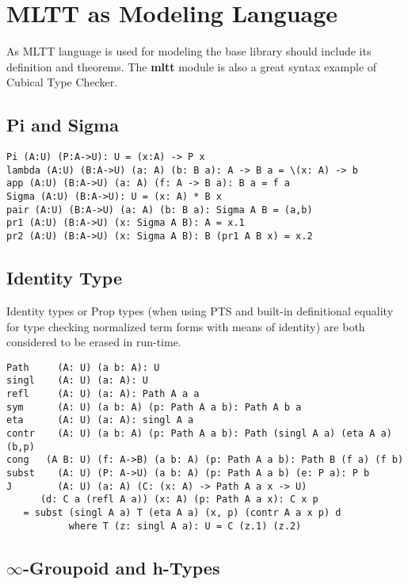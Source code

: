 \documentclass{article}
\begin{document}
\section{MLTT as Modeling Language}

As MLTT language is used for modeling the base library should include its definition and theorems.
The {\bf mltt} module is also a great syntax example of Cubical Type Checker.

\subsection{Pi and Sigma}

\begin{lstlisting}[mathescape=true]
Pi (A:U) (P:A->U): U = (x:A) -> P x
lambda (A:U) (B:A->U) (a: A) (b: B a): A -> B a = \(x: A) -> b
app (A:U) (B:A->U) (a: A) (f: A -> B a): B a = f a
Sigma (A:U) (B:A->U): U = (x: A) * B x
pair (A:U) (B:A->U) (a: A) (b: B a): Sigma A B = (a,b)
pr1 (A:U) (B:A->U) (x: Sigma A B): A = x.1
pr2 (A:U) (B:A->U) (x: Sigma A B): B (pr1 A B x) = x.2
\end{lstlisting}

\subsection{Identity Type}

Identity types or Prop types (when using PTS and built-in definitional equality for type checking
normalized term forms with means of identity) are both considered to be erased in run-time.

\begin{lstlisting}[mathescape=true]
Path     (A: U) (a b: A): U
singl    (A: U) (a: A): U
refl     (A: U) (a: A): Path A a a
sym      (A: U) (a b: A) (p: Path A a b): Path A b a
eta      (A: U) (a: A): singl A a
contr    (A: U) (a b: A) (p: Path A a b): Path (singl A a) (eta A a) (b,p)
cong   (A B: U) (f: A->B) (a b: A) (p: Path A a b): Path B (f a) (f b)
subst    (A: U) (P: A->U) (a b: A) (p: Path A a b) (e: P a): P b
J        (A: U) (a: A) (C: (x: A) -> Path A a x -> U)
      (d: C a (refl A a)) (x: A) (p: Path A a x): C x p
   = subst (singl A a) T (eta A a) (x, p) (contr A a x p) d
           where T (z: singl A a): U = C (z.1) (z.2)
\end{lstlisting}

\subsection{$\infty$-Groupoid and h-Types}
\end{document}
